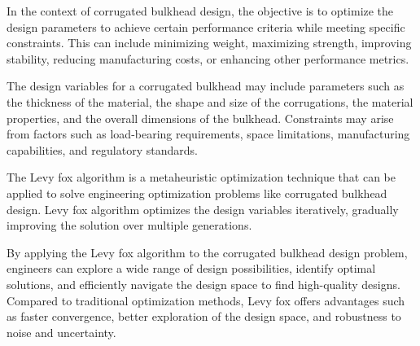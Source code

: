 \documentclass[
]{article}
\begin{document}
\begin{justify}
{In the context of corrugated bulkhead design, the objective is to optimize the design parameters to achieve certain performance criteria while meeting specific constraints. This can include minimizing weight, maximizing strength, improving stability, reducing manufacturing costs, or enhancing other performance metrics.

The design variables for a corrugated bulkhead may include parameters such as the thickness of the material, the shape and size of the corrugations, the material properties, and the overall dimensions of the bulkhead. Constraints may arise from factors such as load-bearing requirements, space limitations, manufacturing capabilities, and regulatory standards.

The Levy fox algorithm is a metaheuristic optimization technique that can be applied to solve engineering optimization problems like corrugated bulkhead design. Levy fox algorithm optimizes the design variables iteratively, gradually improving the solution over multiple generations.

By applying the Levy fox algorithm to the corrugated bulkhead design problem, engineers can explore a wide range of design possibilities, identify optimal solutions, and efficiently navigate the design space to find high-quality designs. Compared to traditional optimization methods, Levy fox offers advantages such as faster convergence, better exploration of the design space, and robustness to noise and uncertainty.

}
\end{justify}
\end{document}
